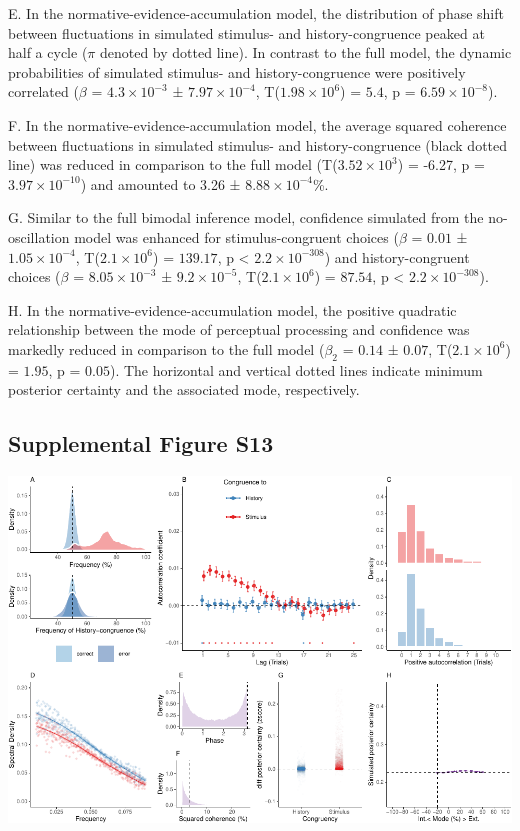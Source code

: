 \documentclass[
]{article}
\begin{document}
E. In the normative-evidence-accumulation model, the distribution of
phase shift between fluctuations in simulated stimulus- and
history-congruence peaked at half a cycle (\(\pi\) denoted by dotted
line). In contrast to the full model, the dynamic probabilities of
simulated stimulus- and history-congruence were positively correlated
(\(\beta\) = \(\ensuremath{4.3\times 10^{-3}}\) ±
\(\ensuremath{7.97\times 10^{-4}}\),
T(\(\ensuremath{1.98\times 10^{6}}\)) = \(5.4\), p =
\(\ensuremath{6.59\times 10^{-8}}\)).

F. In the normative-evidence-accumulation model, the average squared
coherence between fluctuations in simulated stimulus- and
history-congruence (black dotted line) was reduced in comparison to the
full model (T(\ensuremath{3.52\times 10^{3}}) = -6.27, p =
\(\ensuremath{3.97\times 10^{-10}}\)) and amounted to 3.26 ±
\ensuremath{8.88\times 10^{-4}}\%.

G. Similar to the full bimodal inference model, confidence simulated
from the no-oscillation model was enhanced for stimulus-congruent
choices (\(\beta\) = \(0.01\) ± \(\ensuremath{1.05\times 10^{-4}}\),
T(\(\ensuremath{2.1\times 10^{6}}\)) = \(139.17\), p < \(\ensuremath{2.2\times 10^{-308}}\)) and
history-congruent choices (\(\beta\) =
\(\ensuremath{8.05\times 10^{-3}}\) ±
\(\ensuremath{9.2\times 10^{-5}}\), T(\(\ensuremath{2.1\times 10^{6}}\))
= \(87.54\), p < \(\ensuremath{2.2\times 10^{-308}}\)).

H. In the normative-evidence-accumulation model, the positive quadratic
relationship between the mode of perceptual processing and confidence
was markedly reduced in comparison to the full model (\(\beta_2\) =
\(0.14\) ± \(0.07\), T(\(\ensuremath{2.1\times 10^{6}}\)) = \(1.95\), p
= \(0.05\)). The horizontal and vertical dotted lines indicate minimum
posterior certainty and the associated mode, respectively.

\newpage

\hypertarget{supplemental-figure-s13}{%
\subsection{Supplemental Figure S13}\label{supplemental-figure-s13}}

\includegraphics{modes_mouse_rev1b_clean_files/figure-latex/Supplemental_Figure_13-1.pdf}
\end{document}
